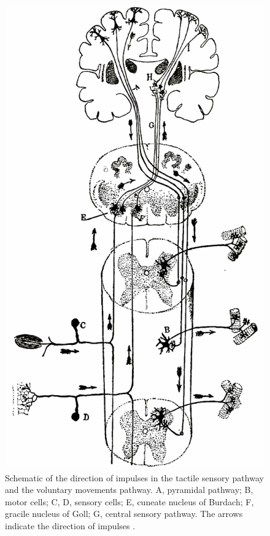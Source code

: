 \begin{figure}
\begin{center}
\includegraphics[width=0.65\columnwidth]{chapters/figuresChTeleology/cajalPathway}
\end{center}
\vspace{-5mm}
\caption{Schematic of the direction of impulses in the tactile sensory pathway and the voluntary movements pathway. A, pyramidal pathway; B, motor cells; C, D, sensory cells; E, cuneate nucleus of Burdach; F, gracile nucleus of Goll; G, central sensory pathway. The arrows indicate the direction of impulses \protect\cite[p.540]{RamonYCajal1909}.}
\label{fig:cajalPathway}
\end{figure}

